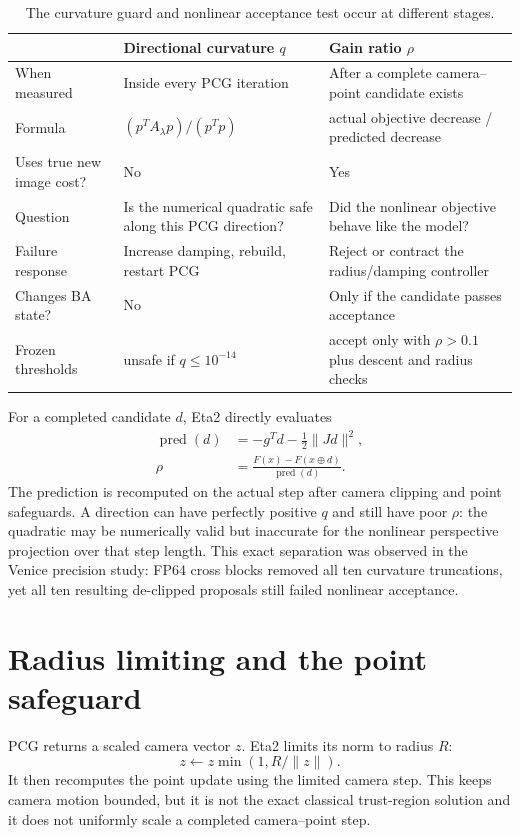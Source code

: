 \documentclass[11pt]{article}
\begin{document}
\begin{table}[ht]
\centering
\small
\caption{The curvature guard and nonlinear acceptance test occur at different stages.}
\begin{tabularx}{\textwidth}{@{}lYY@{}}
\toprule
 & Directional curvature $q$ & Gain ratio $\rho$\\
\midrule
When measured & Inside every PCG iteration & After a complete camera--point candidate exists\\
Formula & $(p^TA_\lambda p)/(p^Tp)$ & actual objective decrease / predicted decrease\\
Uses true new image cost? & No & Yes\\
Question & Is the numerical quadratic safe along this PCG direction? & Did the nonlinear objective behave like the model?\\
Failure response & Increase damping, rebuild, restart PCG & Reject or contract the radius/damping controller\\
Changes BA state? & No & Only if the candidate passes acceptance\\
Frozen thresholds & unsafe if $q\le10^{-14}$ & accept only with $\rho>0.1$ plus descent and radius checks\\
\bottomrule
\end{tabularx}
\end{table}

For a completed candidate $d$, Eta2 directly evaluates
\begin{align}
  \operatorname{pred}(d)&=-g^Td-\frac12\lVert Jd\rVert^2,\\
  \rho&=\frac{F(x)-F(x\oplus d)}{\operatorname{pred}(d)}.
\end{align}
The prediction is recomputed on the actual step after camera clipping and point safeguards.  A direction can have perfectly positive $q$ and still have poor $\rho$: the quadratic may be numerically valid but inaccurate for the nonlinear perspective projection over that step length.  This exact separation was observed in the Venice precision study: FP64 cross blocks removed all ten curvature truncations, yet all ten resulting de-clipped proposals still failed nonlinear acceptance.

\section{Radius limiting and the point safeguard}

PCG returns a scaled camera vector $z$.  Eta2 limits its norm to radius $R$:
\[
  z\leftarrow z\min(1,R/\lVert z\rVert).
\]
It then recomputes the point update using the limited camera step.  This keeps camera motion bounded, but it is not the exact classical trust-region solution and it does not uniformly scale a completed camera--point step.
\end{document}
